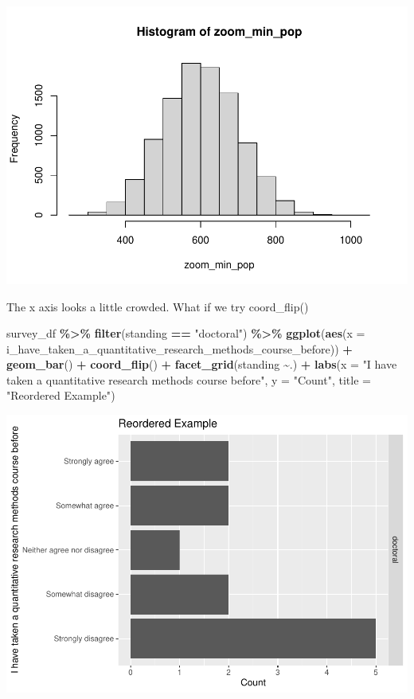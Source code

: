 \documentclass[
]{book}
\newenvironment{Shaded}{\begin{snugshade}}{\end{snugshade}}
\newcommand{\DataTypeTok}[1]{\textcolor[rgb]{0.13,0.29,0.53}{#1}}
\newcommand{\KeywordTok}[1]{\textcolor[rgb]{0.13,0.29,0.53}{\textbf{#1}}}
\newcommand{\NormalTok}[1]{#1}
\newcommand{\OperatorTok}[1]{\textcolor[rgb]{0.81,0.36,0.00}{\textbf{#1}}}
\newcommand{\StringTok}[1]{\textcolor[rgb]{0.31,0.60,0.02}{#1}}
\begin{document}
\includegraphics{test_course_notes_files/figure-latex/unnamed-chunk-18-1.pdf}

The x axis looks a little crowded. What if we try coord\_flip()

\begin{Shaded}
\begin{Highlighting}[]
\NormalTok{survey\_df }\OperatorTok{\%\textgreater{}\%}\StringTok{ }
\StringTok{  }\KeywordTok{filter}\NormalTok{(standing }\OperatorTok{==}\StringTok{ "doctoral"}\NormalTok{) }\OperatorTok{\%\textgreater{}\%}
\StringTok{  }\KeywordTok{ggplot}\NormalTok{(}\KeywordTok{aes}\NormalTok{(}\DataTypeTok{x =}\NormalTok{ i\_have\_taken\_a\_quantitative\_research\_methods\_course\_before)) }\OperatorTok{+}
\StringTok{  }\KeywordTok{geom\_bar}\NormalTok{() }\OperatorTok{+}
\StringTok{  }\KeywordTok{coord\_flip}\NormalTok{() }\OperatorTok{+}
\StringTok{  }\KeywordTok{facet\_grid}\NormalTok{(standing }\OperatorTok{\textasciitilde{}}\NormalTok{.) }\OperatorTok{+}
\StringTok{  }\KeywordTok{labs}\NormalTok{(}\DataTypeTok{x =} \StringTok{"I have taken a quantitative research methods course before"}\NormalTok{,}
       \DataTypeTok{y =} \StringTok{"Count"}\NormalTok{,}
       \DataTypeTok{title =} \StringTok{"Reordered Example"}\NormalTok{)}
\end{Highlighting}
\end{Shaded}

\includegraphics{test_course_notes_files/figure-latex/unnamed-chunk-19-1.pdf}
\end{document}
